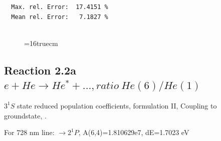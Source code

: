 \documentclass[12pt,dvips]{article}
\begin{document}
\begin{small}
\begin{verbatim}
  Max. rel. Error:  17.4151 %
  Mean rel. Error:   7.1827 %


\end{verbatim}\end{small}
\begin{figure} \label{2.1.8lr2o}
\epsfxsize=16truecm
\end{figure}
\newpage



\subsection{
  Reaction 2.2a $e + He \rightarrow He^* + ...,  ratio ~ He(6)/He(1)$
}

  $3^1S$ state
  reduced population coefficients, formulation II,
  Coupling to groundstate, \cite{kn:Fujimoto}.

  For 728 nm line:  $\rightarrow 2^1P$, A(6,4)=1.810629e7, dE=1.7023 eV
\end{document}
